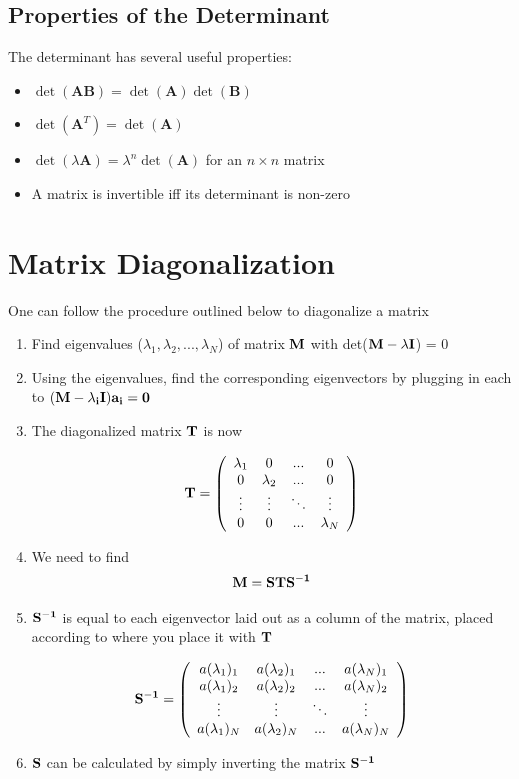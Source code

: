 \subsection{Properties of the Determinant}
The determinant has several useful properties:
\begin{itemize}
    \item $\det(\textbf{A}\textbf{B}) = \det(\textbf{A})\det(\textbf{B})$
    \item $\det(\textbf{A}^T) = \det(\textbf{A})$
    \item $\det(\lambda \textbf{A}) = \lambda^n \det(\textbf{A})$ for an $n \times n$ matrix
    \item A matrix is invertible iff its determinant is non-zero
\end{itemize}

\section{Matrix Diagonalization}\label{diagonalize}
One can follow the procedure outlined below to diagonalize a matrix\cite{griffiths_qm}

\begin{enumerate}
\item Find eigenvalues ($\lambda_1, \lambda_2, ... , \lambda_N$) of matrix $\bf{M}$ with det($\bf{M}-\lambda\bf{I}$) = 0
\item Using the eigenvalues, find the corresponding eigenvectors by plugging in each to $(\bf{M}-\lambda_i\bf{I})\bf{a_i} = 0$
\item The diagonalized matrix $\bf{T}$ is now 

$$\bf{T} = \left(
{\begin{array}{cccc}
\lambda_1 & 0 &...&0 \\
0 & \lambda_2 & ...&0\\
\vdots & \vdots &\ddots & \vdots \\
0 & 0 & ... &\lambda_N
\end{array}}
\right)
$$

\item We need to find$$ \bf{M} = \bf{STS^{-1}}$$
\item $\bf{S^{-1}}$ is equal to each eigenvector laid out as a column of the matrix, placed according to where you place it with $\bf{T}$

$$\bf{S^{-1}} = \left(
{\begin{array}{cccc}
a(\lambda_1)_1 & a(\lambda_2)_1 &...&a(\lambda_N)_1 \\
a(\lambda_1)_2 & a(\lambda_2)_2 & ...&a(\lambda_N)_2\\
\vdots & \vdots &\ddots & \vdots \\
a(\lambda_1)_N & a(\lambda_2)_N & ... &a(\lambda_N)_N
\end{array}}
\right)
$$

\item $\bf{S}$ can be calculated by simply inverting the matrix $\bf{S^{-1}}$
\end{enumerate}

